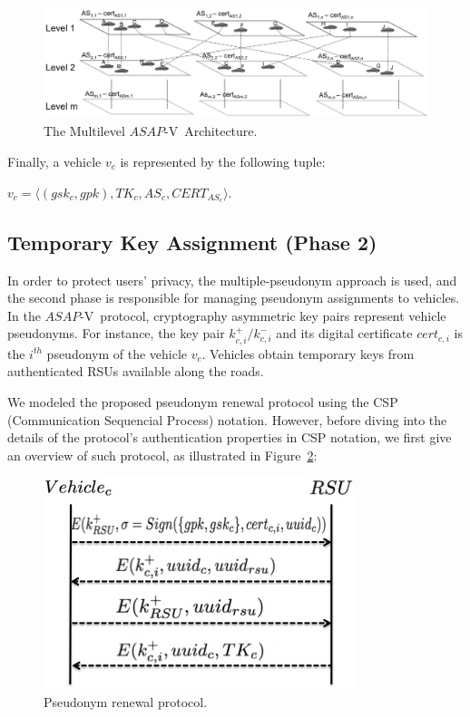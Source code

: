 \documentclass[preprint,12pt]{elsarticle}
\newcommand{\protocolname}{$ASAP$-V}
\begin{document}
\begin{figure}[ht]
\centering
\includegraphics[width=5.5in, height=1.3in]{figures/vehicle-groups3-en.jpg}
\caption{The Multilevel \protocolname~Architecture.}
\label{fig:multilevel-arch}
\end{figure}


Finally, a vehicle $v_{c}$ is represented by the following tuple:

\begin{center}
$v_{c} = \langle (gsk_{c}, gpk), TK_{c}, AS_{c}, CERT_{AS_{c}}  \rangle$.
\end{center}


\subsection{Temporary Key Assignment (Phase 2)}
\label{sec:phase2}

In order to protect users' privacy, the multiple-pseudonym approach is used, and the second phase is responsible for managing pseudonym assignments to vehicles. In the \protocolname~protocol, cryptography asymmetric key pairs represent vehicle pseudonyms. For instance, the key pair $k^{+}_{c, i}/k^{-}_{c, i}$ and its digital certificate $cert_{c,i}$ is the $i^{th}$ pseudonym of the vehicle $v_{c}$. Vehicles obtain temporary keys from authenticated RSUs available along the roads.

We modeled the proposed pseudonym renewal protocol using the CSP (Communication Sequencial Process) notation. However, before diving into the details of the protocol's authentication properties in CSP notation, we first give an overview of such protocol, as illustrated in Figure~\ref{fig:renewalprotocol}:

\begin{figure}[ht]
\centering
\includegraphics[scale=.45]{figures/asapvrenewalprotocol.jpg}
\caption{Pseudonym renewal protocol.}
\label{fig:renewalprotocol}
\end{figure}
\end{document}
